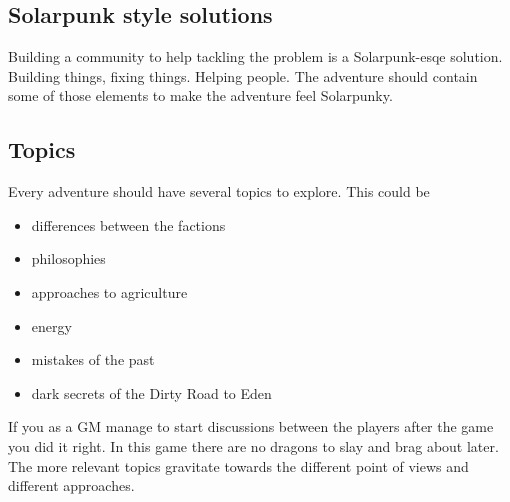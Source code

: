 \subsection{Solarpunk style solutions}

Building a community to help tackling the problem is a Solarpunk-esqe solution. Building things, fixing things. Helping people. The adventure should contain some of those elements to make the adventure feel Solarpunky.

\subsection{Topics}

Every adventure should have several topics to explore. This could be 
\begin{itemize}
    \item differences between the factions
    \item philosophies
    \item approaches to agriculture
    \item energy
    \item mistakes of the past
    \item dark secrets of the Dirty Road to Eden
\end{itemize}

If you as a GM manage to start discussions between the players after the game you did it right. In this game there are no dragons to slay and brag about later. The more relevant topics gravitate towards the different point of views and different approaches.
